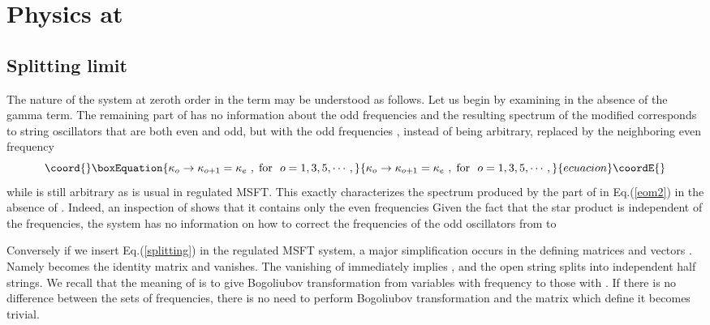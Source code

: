 \documentclass[a4paper,aps,preprint,nofootinbib,eqsecnum]{revtex4}
\begin{document}
\section{Physics at \coordHE{}}

\subsection{Splitting limit}

The nature of the system at zeroth order in the \myHighlight{$\gamma $}\coordHE{} term may be
understood as follows. Let us begin by examining \coordHE{} in the absence of
the gamma term.
The remaining part of \coordHE{} has no information about the odd frequencies \coordHE{} and the resulting spectrum of the modified \coordHE{} corresponds
to string oscillators that are both even and odd, but with the odd
frequencies \coordHE{}, instead of being arbitrary, replaced by the
neighboring even frequency \coordHE{}%
\begin{equation}\coord{}\boxEquation{
\kappa _{o}\rightarrow \kappa _{o+1}=\kappa _{e}\,\,,\;\mbox{for  }
\,\,o=1,3,5,\cdots ,  \label{splitting}
}{
\kappa _{o}\rightarrow \kappa _{o+1}=\kappa _{e}\,\,,\;\mbox{for  }
\,\,o=1,3,5,\cdots ,  }{ecuacion}\coordE{}\end{equation}%
while \coordHE{} is still arbitrary as is usual in regulated MSFT.
This exactly characterizes the spectrum produced by the \coordHE{}
part of \coordHE{} in Eq.(\ref{eom2}) in the absence of \myHighlight{$\gamma $}\coordHE{}. Indeed, an
inspection of \coordHE{} shows that it contains only the even
frequencies \coordHE{} Given the fact that the star product is
independent of the frequencies, the system \coordHE{} has no information
on how to correct the frequencies of the odd oscillators from \coordHE{}
to \coordHE{}

Conversely if we insert Eq.(\ref{splitting}) in the regulated MSFT system, a
major simplification occurs in the defining matrices and vectors \coordHE{}.
Namely \coordHE{} becomes the identity matrix and \coordHE{} vanishes. The vanishing of \coordHE{} immediately implies \coordHE{}, and the open string splits into
independent half strings. We recall that the meaning of \coordHE{} is to give
Bogoliubov transformation from variables with frequency \coordHE{} to those
with \coordHE{}. If there is no difference between the sets of frequencies,
there is no need to perform Bogoliubov transformation and the matrix which
define it becomes trivial.
\end{document}
